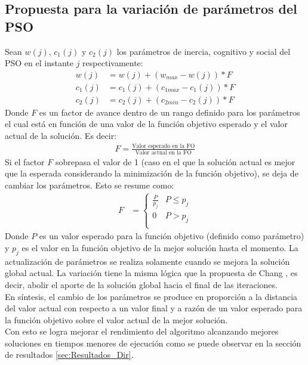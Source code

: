 \subsection{Propuesta para la variación de parámetros del PSO}
Sean $w(j)$, $c_1(j)$ y $c_2(j)$ los parámetros de inercia, cognitivo y social del PSO en el instante $j$ respectivamente:  
\begin{align}\label{eq:VariationParameters_new}
    w(j) &= w(j) + (w_{max} - w(j)) * F \\\label{eq:VariationParameters_new_2}
    c_{1}(j) &= c_1(j) + (c_{1max} - c_1(j)) * F \\\label{eq:VariationParameters_new_3}
    c_{2}(j) &= c_2(j) + (c_{2min} - c_2(j)) * F
\end{align} 
Donde $F$ es un factor de avance dentro de un rango definido para los parámetros el cual está en función de una valor de la función objetivo esperado y el valor actual de la solución. Es decir: 
\begin{align}
  F = \frac{\text{Valor esperado en la FO}}{\text{Valor actual en la FO}}
\end{align}
Si el factor $F$ sobrepasa el valor de 1 (caso en el que la solución actual es mejor que la esperada considerando la minimización de la función objetivo), se deja de cambiar los parámetros. Esto se resume como:
\begin{align}\label{eq:restriction_var_par_new}
    F &= 
        \left\{
            \begin{array}{ll}
                \frac{P}{p_j}  & P \leq p_j\\
                0 & P > p_j\\
            \end{array}
        \right.
\end{align}
Donde $P$ es un valor esperado para la función objetivo (definido como parámetro) y $p_j$ es el valor en la función objetivo de la mejor solución hasta el momento. La actualización de parámetros se realiza solamente cuando se mejora la solución global actual. La variación tiene la misma lógica que la propuesta de Chang \cite{Chang10_2}, es decir, abolir el aporte de la solución global hacia el final de las iteraciones.\\
En síntesis, el cambio de los parámetros se produce en proporción a la distancia del valor actual con respecto a un valor final y a razón de un valor esperado para la función objetivo sobre el valor actual de la mejor solución.\\
 Con esto se logra mejorar el rendimiento del algoritmo alcanzando mejores soluciones en tiempos menores de ejecución como se puede observar en la sección de resultados \ref{sec:Resultados_Dir}.

